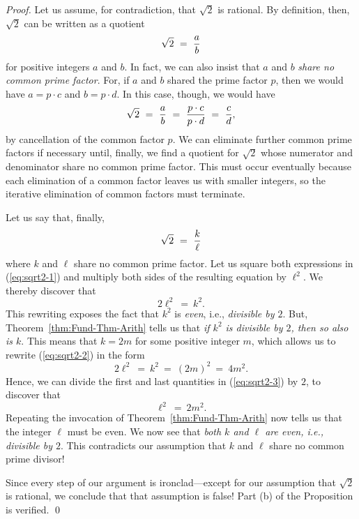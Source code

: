 \begin{proof}
Let us assume, for contradiction, that $\sqrt{2}$ is rational.  By
definition, then, $\sqrt{2}$ can be written as a quotient
\[ \sqrt{2} \ = \ {a \over b} \]
for positive integers $a$ and $b$.  In fact, we can also insist that
$a$ and $b$ {\em share no common prime factor}.  For, if $a$ and $b$
shared the prime factor $p$, then we would have $a = p \cdot c$ and
$b = p \cdot d$.  In this case, though, we would have
\[ \sqrt{2} \ = \ {a \over b} \ = \ \frac{p \cdot c}{p \cdot d}
\ = \ {c \over d},
\]
by cancellation of the common factor $p$.  We can eliminate further
common prime factors if necessary until, finally, we find a quotient
for $\sqrt{2}$ whose numerator and denominator share no common prime
factor.  This must occur eventually because each elimination of a
common factor leaves us with smaller integers, so the iterative
elimination of common factors must terminate.

Let us say that, finally,
\begin{equation}
\label{eq:sqrt2-1}
\sqrt{2} \ = \ {k \over \ell}
\end{equation}
where $k$ and $\ell$ share no common prime factor.  Let us square both
expressions in (\ref{eq:sqrt2-1}) and multiply both sides of the
resulting equation by $\ell^2$.  We thereby discover that
\begin{equation}
\label{eq:sqrt2-2}
2 \ell^2 \ = \ k^2.
\end{equation}
This rewriting exposes the fact that $k^2$ is {\em even},
i.e., {\em divisible by $2$}.  But, Theorem~\ref{thm:Fund-Thm-Arith}
tells us that {\em if $k^2$ is divisible by $2$, then so also is $k$}.
This means that $k = 2m$ for some positive integer $m$, which allows
us to rewrite (\ref{eq:sqrt2-2}) in the form
\begin{equation}
\label{eq:sqrt2-3}
2 \ell^2 \ = \ k^2 \ = \ (2m)^2 \ = \ 4m^2.
\end{equation}
Hence, we can divide the first and last quantities in
(\ref{eq:sqrt2-3}) by $2$, to discover that
\[ \ell^2 \ = \ 2m^2. \]
Repeating the invocation of Theorem~\ref{thm:Fund-Thm-Arith} now tells
us that the integer $\ell$ must be even.  We now see that {\em both
  $k$ and $\ell$ are even, i.e., divisible by $2$}.  This contradicts
our assumption that $k$ and $\ell$ share no common prime divisor!

Since every step of our argument is ironclad---except for our
assumption that $\sqrt{2}$ is rational, we conclude that that
assumption is false!  Part (b) of the Proposition is verified. \qed
\end{proof}

